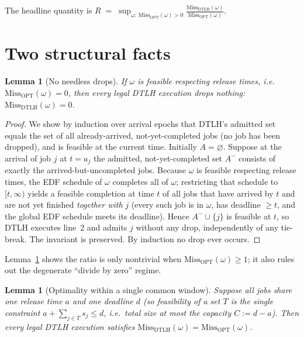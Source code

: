 \documentclass{amsart}
\newtheorem{lemma}[theorem]{Lemma}
\theoremstyle{definition}
\begin{document}
The headline quantity is
\(
R \;=\; \sup_{\omega:\ \mathrm{Miss}_{\mathrm{OPT}}(\omega)>0}
\frac{\mathrm{Miss}_{\mathrm{DTLH}}(\omega)}{\mathrm{Miss}_{\mathrm{OPT}}(\omega)} .
\)

\section{Two structural facts}

\begin{lemma}[No needless drops]\label{lem:nowaste}
If $\omega$ is feasible respecting release times, i.e.\
$\mathrm{Miss}_{\mathrm{OPT}}(\omega)=0$, then \emph{every} legal DTLH execution
drops nothing: $\mathrm{Miss}_{\mathrm{DTLH}}(\omega)=0$.
\end{lemma}

\begin{proof}
We show by induction over arrival epochs that DTLH's admitted set equals the set
of all already-arrived, not-yet-completed jobs (no job has been dropped), and is
feasible at the current time. Initially $A=\varnothing$. Suppose at the arrival
of job $j$ at $t=a_j$ the admitted, not-yet-completed set $A^-$ consists of
exactly the arrived-but-uncompleted jobs. Because $\omega$ is feasible
respecting release times, the EDF schedule of $\omega$ completes all of $\omega$;
restricting that schedule to $[t,\infty)$ yields a feasible completion at time
$t$ of all jobs that have arrived by $t$ and are not yet finished \emph{together
with} $j$ (every such job is in $\omega$, has deadline $\ge t$, and the global
EDF schedule meets its deadline). Hence $A^-\cup\{j\}$ is feasible at $t$, so
DTLH executes line~2 and admits $j$ without any drop, independently of any
tie-break. The invariant is preserved. By induction no drop ever occurs.
\end{proof}

Lemma~\ref{lem:nowaste} shows the ratio is only nontrivial when
$\mathrm{Miss}_{\mathrm{OPT}}(\omega)\ge 1$; it also rules out the degenerate
``divide by zero'' regime.

\begin{lemma}[Optimality within a single common window]\label{lem:onewindow}
Suppose all jobs share one release time $a$ and one deadline $d$ (so feasibility
of a set $T$ is the single constraint $a+\sum_{j\in T}s_j\le d$, i.e.\ total size
at most the capacity $C:=d-a$). Then every legal DTLH execution satisfies
$\mathrm{Miss}_{\mathrm{DTLH}}(\omega)=\mathrm{Miss}_{\mathrm{OPT}}(\omega)$.
\end{lemma}
\end{document}
